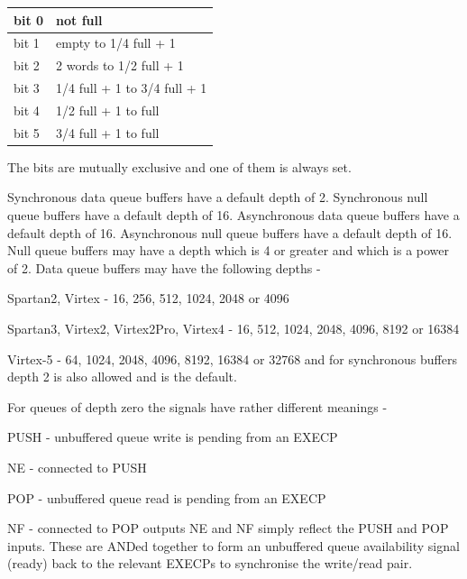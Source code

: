                 \begin{tabular}{| l | l |}
                \hline
                bit 0 & not full                        \\ \hline
                bit 1 & empty to 1/4 full + 1           \\ \hline
                bit 2 & 2 words to 1/2 full  + 1        \\ \hline
                bit 3 & 1/4 full + 1 to 3/4 full  + 1   \\ \hline
                bit 4 & 1/2 full + 1 to full            \\ \hline 
                bit 5 & 3/4 full + 1 to full            \\ \hline  
                \end{tabular}
                
                The bits are mutually exclusive and one of them is always set.
            
                Synchronous data queue buffers have a default depth of 2.
                Synchronous null queue buffers have a default depth of 16.
                Asynchronous data queue buffers have a default depth of 16.
                Asynchronous null queue buffers have a default depth of 16. Null
                queue buffers may have a depth which is 4 or greater and which is
                a power of 2. Data queue buffers may have the following depths -
                \blist
                \item   Spartan2, Virtex - 16, 256, 512, 1024, 2048 or 4096
                \item   Spartan3, Virtex2, Virtex2Pro, Virtex4 - 16, 512, 1024, 2048, 4096, 8192 or 16384
                \item   Virtex-5 - 64, 1024, 2048, 4096, 8192, 16384 or 32768
                \blend
                and for synchronous buffers depth 2 is also allowed and is
                the default.
                
                For queues of depth zero the signals have rather different
                meanings -
                \blist
                \item   PUSH - unbuffered queue write is pending from an EXECP
                \item   NE - connected to PUSH
                \item   POP - unbuffered queue read is pending from an EXECP
                \item   NF - connected to POP
                \blend
                outputs NE and NF simply reflect the PUSH and POP inputs. These
                are ANDed together to form an unbuffered queue availability
                signal (ready) back to the relevant EXECPs to synchronise the
                write/read pair.
                

